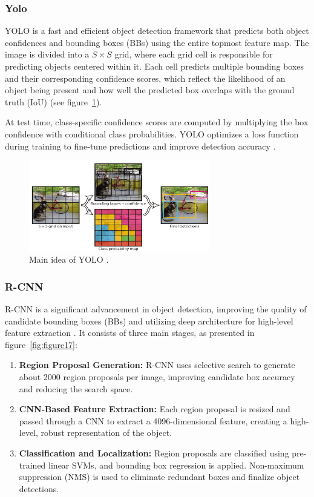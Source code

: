 \subsubsection{Yolo}
YOLO is a fast and efficient object detection framework that predicts both object confidences and bounding boxes (BBs) using the entire topmost feature map. The image is divided into a $S \times S$ grid, where each grid cell is responsible for predicting objects centered within it. Each cell predicts multiple bounding boxes and their corresponding confidence scores, which reflect the likelihood of an object being present and how well the predicted box overlaps with the ground truth (IoU) (see figure~\ref{fig:figure16}).

At test time, class-specific confidence scores are computed by multiplying the box confidence with conditional class probabilities. YOLO optimizes a loss function during training to fine-tune predictions and improve detection accuracy \parencite{zhao2019objectdetection}.

\begin{figure}[H] %
    \centering
    \includegraphics[width=0.7\textwidth]{chapters/chapter1/images/Figure16.png}
    \caption{Main idea of YOLO \parencite{zhao2019objectdetection}.}
    \label{fig:figure16}
\end{figure}

\subsubsection{R-CNN}
R-CNN is a significant advancement in object detection, improving the quality of candidate bounding boxes (BBs) and utilizing deep architecture for high-level feature extraction \parencite{zhao2019objectdetection}. It consists of three main stages, as presented in figure~\ref{fig:figure17}:

\begin{enumerate}
    \item \textbf{Region Proposal Generation:} R-CNN uses selective search to generate about 2000 region proposals per image, improving candidate box accuracy and reducing the search space.
    \item \textbf{CNN-Based Feature Extraction:} Each region proposal is resized and passed through a CNN to extract a 4096-dimensional feature, creating a high-level, robust representation of the object.
    \item \textbf{Classification and Localization:} Region proposals are classified using pre-trained linear SVMs, and bounding box regression is applied. Non-maximum suppression (NMS) is used to eliminate redundant boxes and finalize object detections.
\end{enumerate}

